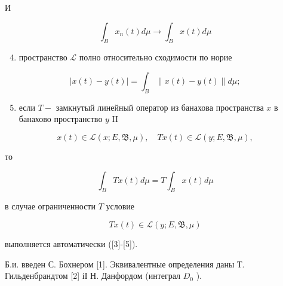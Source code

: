 \documentclass[10pt]{article}
\begin{document}
И



\[

\int_{B} x_{n}(t) d \mu \longrightarrow \int_{B} x(t) d \mu

\]



\begin{enumerate}

  \setcounter{enumi}{3}

  \item пространство $\mathscr{L}$ полно относительно сходимости по норие

\end{enumerate}



\[

|x(t)-y(t)|=\int_{B}\|x(t)-y(t)\| d \mu ;

\]



\begin{enumerate}

  \setcounter{enumi}{4}

  \item если $T-$ замкнутый линейный оператор из банахова пространства $x$ в банахово пространство $y$ II

\end{enumerate}



\[

x(t) \in \mathscr{L}(x ; E, \mathfrak{B}, \mu), \quad T x(t) \in \mathscr{L}(y ; E, \mathfrak{B}, \mu),

\]



то



\[

\int_{B} T x(t) d \mu=T \int_{B} x(t) d \mu

\]



в случае ограниченности $T$ условие



\[

T x(t) \in \mathscr{L}(y ; E, \mathfrak{B}, \mu)

\]



выполняется автоматически ([3]-[5]).



Б.и. введен С. Бохнером [1]. Эквивалентные определения даны Т. Гильденбрандтом [2] іІ Н. Данфордом (интеграл $D_{0}$ ).
\end{document}
